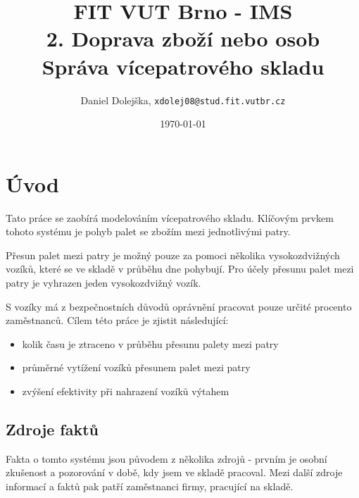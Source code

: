 \documentclass[11pt]{article}
\title{\textbf{FIT VUT Brno - IMS}\\
	2. Doprava zboží nebo osob\\
	Správa vícepatrového skladu}
\author{Daniel Dolejška, \texttt{xdolej08@stud.fit.vutbr.cz}}
\date{\today}
\begin{document}
	
	\maketitle
	\tableofcontents
	
	
	\newpage
	
	\section{Úvod}
	Tato práce se zaobírá modelováním vícepatrového skladu.
	Klíčovým prvkem tohoto systému je pohyb palet se zbožím mezi jednotlivými patry.
	
	Přesun palet mezi patry je možný pouze za pomoci několika vysokozdvižných vozíků, které se ve skladě v průběhu dne pohybují.
	Pro účely přesunu palet mezi patry je vyhrazen jeden vysokozdvižný vozík.
	
	S vozíky má z bezpečnostních důvodů oprávnění pracovat pouze určité procento zaměstnanců.
	Cílem této práce je zjistit následující:
	\begin{itemize}
		\item kolik času je ztraceno v průběhu přesunu palety mezi patry
		\item průměrné vytížení vozíků přesunem palet mezi patry
		\item zvýšení efektivity při nahrazení vozíků výtahem
	\end{itemize}

	\subsection{Zdroje faktů}
	Fakta o tomto systému jsou původem z několika zdrojů - prvním je osobní zkušenost a pozorování v době, kdy jsem ve skladě pracoval.
	Mezi další zdroje informací a faktů pak patří zaměstnanci firmy, pracující na skladě.
\end{document}
